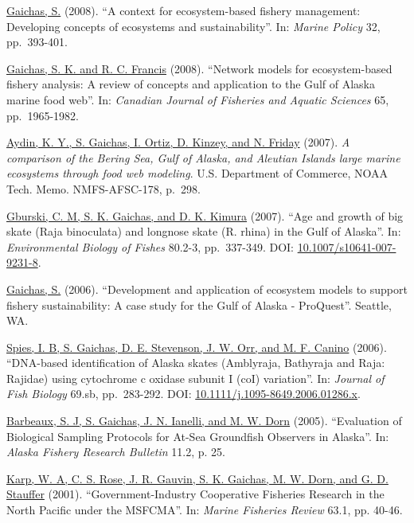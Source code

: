\documentclass[11pt, a4paper]{awesome-cv}
\begin{document}
\protect\hyperlink{cite-gaichas_context_2008}{Gaichas,
S.} (2008). ``A context for ecosystem-based
fishery management: Developing concepts of ecosystems and
sustainability''. In: \emph{Marine Policy} 32, pp.~393-401.

\protect\hyperlink{cite-gaichas_network_2008}{Gaichas, S. K. and R. C.
Francis} (2008). ``Network models for
ecosystem-based fishery analysis: A review of concepts and application
to the Gulf of Alaska marine food web''. In: \emph{Canadian Journal of
Fisheries and Aquatic Sciences} 65, pp.~1965-1982.

\protect\hyperlink{cite-aydin_comparison_2007}{Aydin, K. Y., S. Gaichas, I.
Ortiz, D. Kinzey, and N. Friday} (2007).
\emph{A comparison of the Bering Sea, Gulf of Alaska, and Aleutian Islands
large marine ecosystems through food web modeling}. U.S. Department of
Commerce, NOAA Tech. Memo. NMFS-AFSC-178, p.~298.

\protect\hyperlink{cite-gburski_age_2007}{Gburski, C. M, S. K. Gaichas, and D.
K. Kimura} (2007). ``Age and growth of big skate
(Raja binoculata) and longnose skate (R. rhina) in the Gulf of Alaska''.
In: \emph{Environmental Biology of Fishes} 80.2-3, pp.~337-349. DOI:
\href{https://doi.org/10.1007\%2Fs10641-007-9231-8}{10.1007/s10641-007-9231-8}.

\protect\hyperlink{cite-gaichas_development_2006}{Gaichas,
S.} (2006). ``Development and
application of ecosystem models to support fishery sustainability: A
case study for the Gulf of Alaska - ProQuest''. Seattle, WA.

\protect\hyperlink{cite-spies_dna-based_2006}{Spies, I. B, S. Gaichas, D. E.
Stevenson, J. W. Orr, and M. F. Canino}
(2006). ``DNA-based identification of Alaska skates (Amblyraja,
Bathyraja and Raja: Rajidae) using cytochrome c oxidase subunit I (coI)
variation''. In: \emph{Journal of Fish Biology} 69.sb, pp.~283-292. DOI:
\href{https://doi.org/10.1111\%2Fj.1095-8649.2006.01286.x}{10.1111/j.1095-8649.2006.01286.x}.

\protect\hyperlink{cite-barbeaux_evaluation_2005}{Barbeaux, S. J, S. Gaichas,
J. N. Ianelli, and M. W. Dorn} (2005).
``Evaluation of Biological Sampling Protocols for At-Sea Groundfish
Observers in Alaska''. In: \emph{Alaska Fishery Research Bulletin} 11.2, p.
25.

\protect\hyperlink{cite-karp_government-industry_2001}{Karp, W. A, C. S. Rose,
J. R. Gauvin, S. K. Gaichas, M. W. Dorn, and G. D.
Stauffer} (2001).
``Government-Industry Cooperative Fisheries Research in the North
Pacific under the MSFCMA''. In: \emph{Marine Fisheries Review} 63.1, pp.
40-46.
\end{document}
